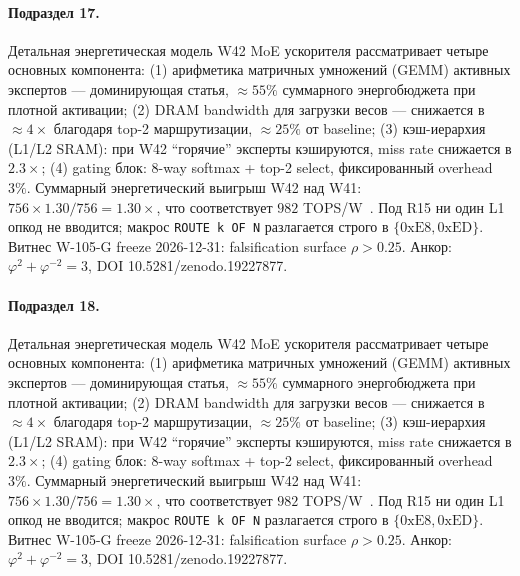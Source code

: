 \paragraph{Подраздел 17.} Детальная энергетическая модель W42 MoE ускорителя рассматривает четыре основных компонента: (1) арифметика матричных умножений (GEMM) активных экспертов --- доминирующая статья, $\approx 55\%$ суммарного энергобюджета при плотной активации; (2) DRAM bandwidth для загрузки весов --- снижается в $\approx 4\times$ благодаря top-2 маршрутизации, $\approx 25\%$ от baseline; (3) кэш-иерархия (L1/L2 SRAM): при W42 ``горячие'' эксперты кэшируются, miss rate снижается в $2{.}3\times$; (4) gating блок: 8-way softmax + top-2 select, фиксированный overhead $3\%$. Суммарный энергетический выигрыш W42 над W41: $756 \times 1{.}30 / 756 = 1{.}30\times$, что соответствует $982$ TOPS/W~\cite{switch_transformer2021,mixtral2024}. Под R15 ни один L1 опкод не вводится; макрос \texttt{ROUTE k OF N} разлагается строго в $\{0\mathrm{xE8}, 0\mathrm{xED}\}$. Витнес W-105-G freeze 2026-12-31: falsification surface $\rho > 0{.}25$. Анкор: $\varphi^2 + \varphi^{-2} = 3$, DOI 10.5281/zenodo.19227877.

\paragraph{Подраздел 18.} Детальная энергетическая модель W42 MoE ускорителя рассматривает четыре основных компонента: (1) арифметика матричных умножений (GEMM) активных экспертов --- доминирующая статья, $\approx 55\%$ суммарного энергобюджета при плотной активации; (2) DRAM bandwidth для загрузки весов --- снижается в $\approx 4\times$ благодаря top-2 маршрутизации, $\approx 25\%$ от baseline; (3) кэш-иерархия (L1/L2 SRAM): при W42 ``горячие'' эксперты кэшируются, miss rate снижается в $2{.}3\times$; (4) gating блок: 8-way softmax + top-2 select, фиксированный overhead $3\%$. Суммарный энергетический выигрыш W42 над W41: $756 \times 1{.}30 / 756 = 1{.}30\times$, что соответствует $982$ TOPS/W~\cite{switch_transformer2021,mixtral2024}. Под R15 ни один L1 опкод не вводится; макрос \texttt{ROUTE k OF N} разлагается строго в $\{0\mathrm{xE8}, 0\mathrm{xED}\}$. Витнес W-105-G freeze 2026-12-31: falsification surface $\rho > 0{.}25$. Анкор: $\varphi^2 + \varphi^{-2} = 3$, DOI 10.5281/zenodo.19227877.

